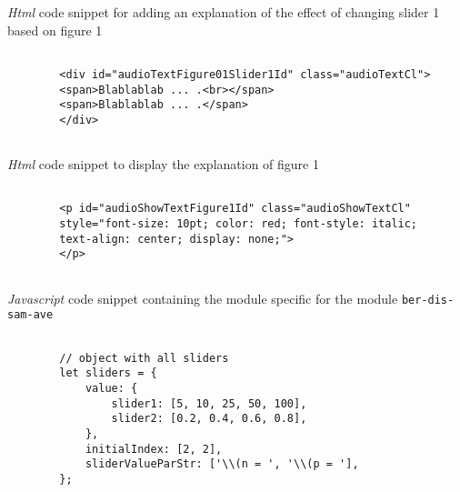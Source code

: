 \documentclass[12pt]{article}
\begin{document}
\begin{CodeSnippet}[!hp]
	\centering
	\caption{\emph{Html} code snippet for adding an explanation of the effect of changing slider 1 based on figure 1}
	\footnotesize
	\vspace{0.25cm}
	\begin{BVerbatim}
		
		<div id="audioTextFigure01Slider1Id" class="audioTextCl">
		<span>Blablablab ... .<br></span>
		<span>Blablablab ... .</span>
		</div>
		
	\end{BVerbatim}
	\label{HtmlCodSnipDivSliderExplainText}
\end{CodeSnippet}

\begin{CodeSnippet}[!hp]
	\centering
	\caption{\emph{Html} code snippet to display the explanation of figure 1}
	\footnotesize
	\vspace{0.25cm}
	\begin{BVerbatim}
		
		<p id="audioShowTextFigure1Id" class="audioShowTextCl"
		style="font-size: 10pt; color: red; font-style: italic;
		text-align: center; display: none;">
		</p>
		
	\end{BVerbatim}
	\label{HtmlCodSniPShowExplanationTag}
\end{CodeSnippet}

\begin{CodeSnippet}[!hp]
	\centering
	\caption{\emph{Javascript} code snippet containing the module specific for the module \texttt{ber-dis-sam-ave}}
	\footnotesize
	\vspace{0.25cm}
	\begin{BVerbatim}
		
		// object with all sliders
		let sliders = {
			value: {
				slider1: [5, 10, 25, 50, 100],
				slider2: [0.2, 0.4, 0.6, 0.8],
			},
			initialIndex: [2, 2],
			sliderValueParStr: ['\\(n = ', '\\(p = '],
		};
		
	\end{BVerbatim}
	\label{JsCodSniInt}
\end{CodeSnippet}

\pagebreak
\FloatBarrier



	
\end{document}

